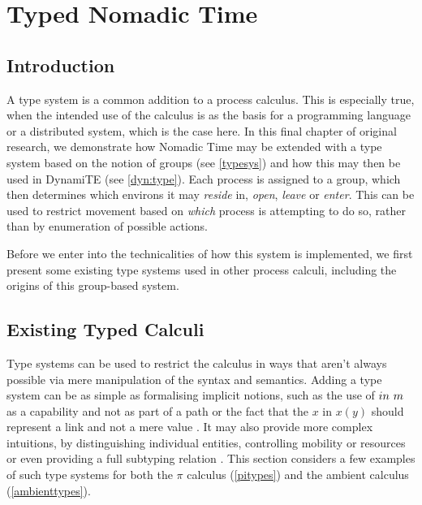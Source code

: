 
\chapter{Typed Nomadic Time}
\label{tnt}

\section{Introduction}

A type system is a common addition to a process calculus.  This is
especially true, when the intended use of the calculus is as the basis
for a programming language or a distributed system, which is the case
here.  In this final chapter of original research, we demonstrate how
Nomadic Time may be extended with a type system based on the notion of
groups (see \ref{typesys}) and how this may then be used in DynamiTE
(see \ref{dyn:type}).  Each process is assigned to a group, which then
determines which environs it may \emph{reside} in, \emph{open},
\emph{leave} or \emph{enter}.  This can be used to restrict movement
based on \emph{which} process is attempting to do so, rather than by
enumeration of possible actions.

Before we enter into the technicalities of how this system is
implemented, we first present some existing type systems used in other
process calculi, including the origins of this group-based system.

\section{Existing Typed Calculi}
\label{typedcalculi}

Type systems can be used to restrict the calculus in ways that aren't
always possible via mere manipulation of the syntax and semantics.
Adding a type system can be as simple as formalising implicit notions,
such as the use of $in\ m$ as a capability and not as part of a
path \cite{ambienttypes} or the fact that the $x$ in $x(y)$ should
represent a link and not a mere value \cite{sangiorgi:types-or}.  It
may also provide more complex intuitions, by distinguishing individual
entities, controlling mobility
\cite*{ambienttypes,sangiorgi:mobsafeambients} or resources
\cite*{hennessy:dpi98} or even providing a full subtyping relation
\cite*{sangiorgi:typing,boxedamb02}.  This section considers a few
examples of such type systems for both the $\pi$ calculus
(\ref{pitypes}) and the ambient calculus (\ref{ambienttypes}).

